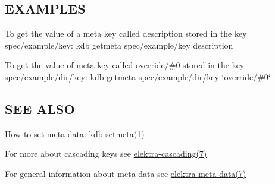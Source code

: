 \subsection*{E\+X\+A\+M\+P\+L\+E\+S}

To get the value of a meta key called {\ttfamily description} stored in the key {\ttfamily spec/example/key}\+: {\ttfamily kdb getmeta spec/example/key description}

To get the value of meta key called {\ttfamily override/\#0} stored in the key {\ttfamily spec/example/dir/key}\+: {\ttfamily kdb getmeta spec/example/dir/key \char`\"{}override/\#0\char`\"{}}

\subsection*{S\+E\+E A\+L\+S\+O}


\begin{DoxyItemize}
\item How to set meta data\+: \hyperlink{md_doc_help_kdb-setmeta_doc_help_kdb-setmeta_md}{kdb-\/setmeta(1)}
\item For more about cascading keys see \hyperlink{md_doc_help_elektra-cascading_doc_help_elektra-cascading_md}{elektra-\/cascading(7)}
\item For general information about meta data see \hyperlink{md_doc_help_elektra-meta-data_doc_help_elektra-meta-data_md}{elektra-\/meta-\/data(7)} 
\end{DoxyItemize}